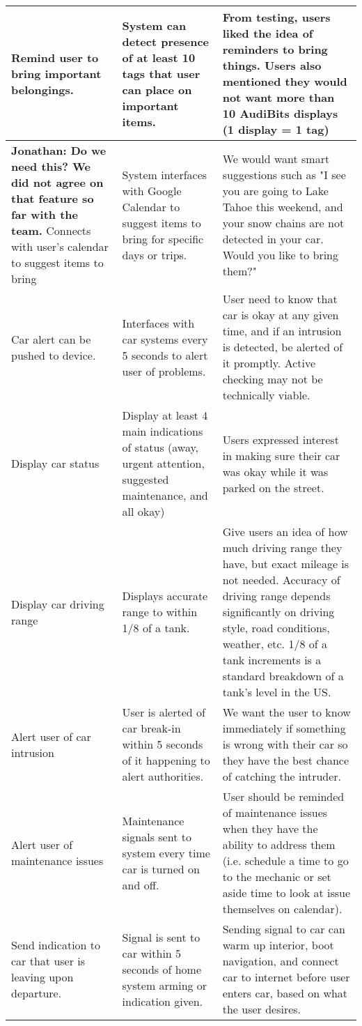 \begin{center}
\begin{supertabular}{| p{32mm} | p{50mm} | p{53mm} | }
        \hline Remind user to bring important belongings. & System can detect presence of at least 10 tags that user can place on important items. & From testing, users liked the idea of reminders to bring things. Users also mentioned they would not want more than 10 AudiBits displays (1 display = 1 tag)\\
        \hline \textbf{Jonathan: Do we need this? We did not agree on that feature so far with the team.} Connects with user's calendar to suggest items to bring & System interfaces with Google Calendar to suggest items to bring for specific days or trips. & We would want smart suggestions such as "I see you are going to Lake Tahoe this weekend, and your snow chains are not detected in your car. Would you like to bring them?" \\
        \hline Car alert can be pushed to device. & Interfaces with car systems every 5 seconds to alert user of problems. & User need to know that car is okay at any given time, and if an intrusion is detected, be alerted of it promptly. Active checking may not be technically viable. \\
        \hline Display car status & Display at least 4 main indications of status (away, urgent attention, suggested maintenance, and all okay) & Users expressed interest in making sure their car was okay while it was parked on the street.\\
        \hline Display car driving range & Displays accurate range to within 1/8 of a tank. & Give users an idea of how much driving range they have, but exact mileage is not needed. Accuracy of driving range depends significantly on driving style, road conditions, weather, etc. 1/8 of a tank increments is a standard breakdown of a tank's level in the US.\\
        \hline Alert user of car intrusion & User is alerted of car break-in within 5 seconds of it happening to alert authorities. & We want the user to know immediately if something is wrong with their car so they have the best chance of catching the intruder.\\
        \hline Alert user of maintenance issues & Maintenance signals sent to system every time car is turned on and off. & User should be reminded of maintenance issues when they have the ability to address them (i.e. schedule a time to go to the mechanic or set aside time to look at issue themselves on calendar).\\
        \hline Send indication to car that user is leaving upon departure. & Signal is sent to car within 5 seconds of home system arming or indication given. & Sending signal to car can warm up interior, boot navigation, and connect car to internet before user enters car, based on what the user desires.\\

\end{supertabular}
\end{center}
